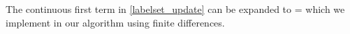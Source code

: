 \documentclass{article} %
\begin{document}
The continuous first term in \eqref{labelset_update} can be expanded to
\beqs
\divop \frac{\nabla \phi}{\|\nabla \phi\|} = 
\eeqs
which we implement in our algorithm using finite differences.




\end{document}
